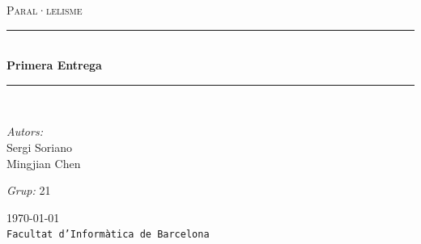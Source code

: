 \documentclass[a4paper,11pt]{article}
\newcommand{\assignatura}{Paral·lelisme}
\newcommand{\titol}{Primera Entrega}
\newcommand{\XXautor}{Sergi Soriano}
\newcommand{\XXXautor}{Mingjian Chen}
\newcommand{\HRule}{\rule{\linewidth}{0.5mm}}
\begin{document}
\begin{titlepage}
  \begin{center}
  \textsc{\Large \assignatura}\\[1.5cm]

  \HRule \\[0.4cm]
	{ \huge \bfseries \titol \\[0.4cm] }

  \HRule \\[1.5cm]

  \noindent
	\begin{minipage}{0.4\textwidth}
	\begin{flushleft} \large
	\emph{Autors:}\\
		\large \XXautor \\
		\large \XXXautor
	\end{flushleft}
	\end{minipage}%
	\begin{minipage}{0.4\textwidth}
	\begin{flushright} \large
	\emph{Grup:} 21 
	\end{flushright}
	\end{minipage}


	\vfill

	{\large \today} \\
    {\large \texttt{Facultat d'Informàtica de Barcelona}}
  \end{center}
\end{titlepage}
\end{document}
